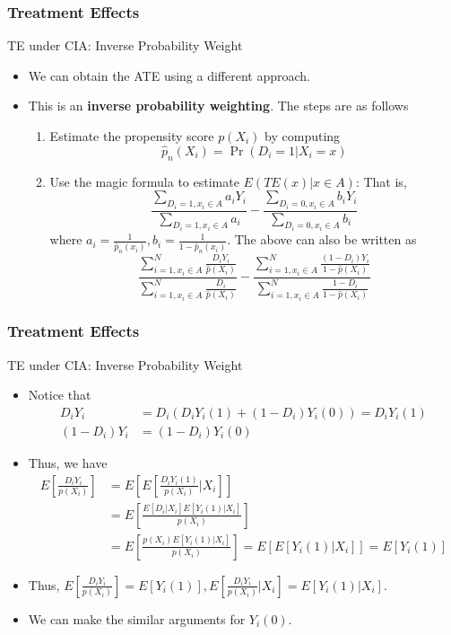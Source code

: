 \documentclass{beamer}
\begin{document}
\begin{frame}
\frametitle{Treatment Effects}
TE under CIA: Inverse Probability Weight
\begin{itemize}
\item We can obtain the ATE using a different approach. 
\item This is an \textbf{inverse probability weighting}. The steps are as follows
\begin{enumerate}
\item Estimate the propensity score $p(X_i)$ by computing
\[
\hat{p}_n(X_i)=\Pr(D_i=1|X_i=x)
\]
\item Use the magic formula to estimate $E(TE(x)|x\in A)$: That is,
\[
\frac{\sum_{D_i=1,x_i\in A}a_iY_i}{\sum_{D_i=1,x_i\in A}a_i}- \frac{\sum_{D_i=0,x_i\in A}b_iY_i}{\sum_{D_i=0,x_i\in A}b_i}
\]
where $a_i=\frac{1}{\hat{p}_n(x_i)}, b_i=\frac{1}{1-\hat{p}_n(x_i)}$. The above can also be written as
\[
\frac{\sum_{i=1,x_i\in A}^N\frac{D_iY_i}{\hat{p}(X_i)}}{\sum_{i=1,x_i\in A}^N\frac{D_i}{\hat{p}(X_i)}}-\frac{\sum_{i=1,x_i\in A}^N\frac{(1-D_i)Y_i}{1-\hat{p}(X_i)}}{\sum_{i=1,x_i\in A}^N\frac{1-D_i}{1-\hat{p}(X_i)}}\]
\end{enumerate}
\end{itemize}
\end{frame}

\begin{frame}
\frametitle{Treatment Effects}
TE under CIA: Inverse Probability Weight
\begin{itemize}
\item  Notice that
\begin{align*}
D_iY_i& = D_i(D_iY_i(1)+(1-D_i)Y_i(0))=D_iY_i(1)\\
(1-D_i)Y_i&=(1-D_i)Y_i(0)
\end{align*}
\item Thus, we have
\footnotesize{\begin{align*}
E\left[\frac{D_iY_i}{p(X_i)}\right]&=E\left[E\left[\frac{D_iY_i(1)}{p(X_i)}|X_i\right]\right]\\
&=E\left[\frac{E[D_i|X_i]E[Y_i(1)|X_i]}{p(X_i)}\right]\\
&=E\left[\frac{p(X_i)E[Y_i(1)|X_i]}{p(X_i)}\right]=E[E[Y_i(1)|X_i]]=E[Y_i(1)]
\end{align*}}\normalsize
\item Thus,  $E\left[\frac{D_iY_i}{p(X_i)}\right]=E[Y_i(1)], E\left[\frac{D_iY_i}{p(X_i)}|X_i\right]=E[Y_i(1)|X_i]$. 
\item We can make the similar arguments for $Y_i(0)$. 
\end{itemize}
\end{frame}
\end{document}
